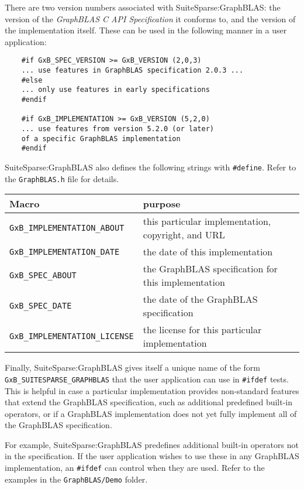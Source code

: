 \documentclass[12pt]{article}
\begin{document}
{There are two version numbers associated with SuiteSparse:GraphBLAS:
the version of the {\em GraphBLAS C API Specification} it
conforms to, and the version of the implementation itself.  These can
be used in the following manner in a user application:

{\footnotesize
\begin{verbatim}
    #if GxB_SPEC_VERSION >= GxB_VERSION (2,0,3)
    ... use features in GraphBLAS specification 2.0.3 ...
    #else
    ... only use features in early specifications
    #endif

    #if GxB_IMPLEMENTATION >= GxB_VERSION (5,2,0)
    ... use features from version 5.2.0 (or later)
    of a specific GraphBLAS implementation
    #endif \end{verbatim}}

SuiteSparse:GraphBLAS also defines the following strings with \verb'#define'.
Refer to the \verb'GraphBLAS.h' file for details.

\vspace{0.2in}
{\footnotesize
\begin{tabular}{ll}
\hline
Macro                & purpose                                      \\
\hline
\verb'GxB_IMPLEMENTATION_ABOUT'
    & this particular implementation, copyright, and URL \\
\verb'GxB_IMPLEMENTATION_DATE'
    & the date of this implementation \\
\verb'GxB_SPEC_ABOUT'
    & the GraphBLAS specification for this implementation \\
\verb'GxB_SPEC_DATE'
    & the date of the GraphBLAS specification \\
\verb'GxB_IMPLEMENTATION_LICENSE'
    & the license for this particular implementation \\
\hline
\end{tabular}
}
\vspace{0.2in}

Finally, SuiteSparse:GraphBLAS gives itself a unique name of the form
\verb'GxB_SUITESPARSE_GRAPHBLAS' that the user application can use in
\verb'#ifdef' tests. This is helpful in case a particular implementation
provides non-standard features that extend the GraphBLAS specification, such as
additional predefined built-in operators, or if a GraphBLAS implementation does
not yet fully implement all of the GraphBLAS specification. 

For example, SuiteSparse:GraphBLAS predefines additional built-in operators not
in the specification.  If the user application wishes to use these in any
GraphBLAS implementation, an \verb'#ifdef' can control when they are used.
Refer to the examples in the \verb'GraphBLAS/Demo' folder.

}
\end{document}
